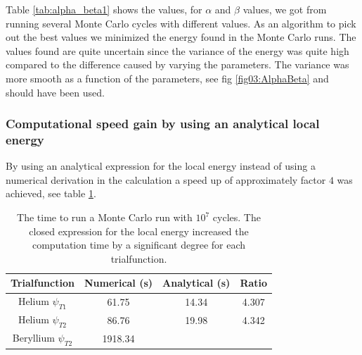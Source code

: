		Table \ref{tab:alpha_beta1} shows the values, for \(\alpha\) and \(\beta\) values, we got from  running several Monte Carlo cycles with different values. As an algorithm to pick out the best values we minimized the energy found in the Monte Carlo runs. The values found are quite uncertain since the variance of the energy was quite high compared to the difference caused by varying the parameters. The variance was more smooth as a function of the parameters, see fig \ref{fig03:AlphaBeta} and should have been used.




			\subsubsection{Computational speed gain by using an analytical local energy}
				By using an analytical expression for the local energy instead of using a numerical derivation in the calculation a speed up of approximately factor \(4\) was achieved, see table \ref{tab:analyticVSNumeric}.


				\begin{table}
					\center
					\begin{tabular}{| c | c | c | c |}
					    \hline
					   	\textbf{Trialfunction} & Numerical (s) & Analytical (s) & Ratio
					    \\ \hline
					    Helium $\psi_{T1}$ & 61.75 & 14.34 & 4.307
					    \\ \hline
					    Helium $\psi_{T2}$ & 86.76 & 19.98	& 4.342
					    \\	\hline
					    Beryllium $\psi_{T2}$ & 1918.34  &	 &
	 				    \\ \hline
					\end{tabular}
					\caption{The time to run a Monte Carlo run with \(10^7\) cycles. The closed expression for the local energy increased the computation time by a significant degree for each trialfunction. }
					\label{tab:analyticVSNumeric}
				\end{table}